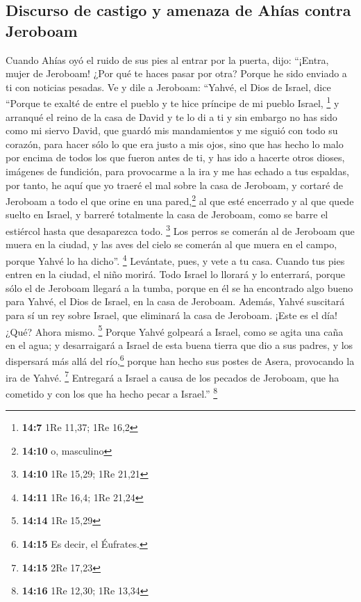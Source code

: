 \hypertarget{discurso-de-castigo-y-amenaza-de-ahuxedas-contra-jeroboam}{%
\subsection{Discurso de castigo y amenaza de Ahías contra
Jeroboam}\label{discurso-de-castigo-y-amenaza-de-ahuxedas-contra-jeroboam}}

 Cuando Ahías oyó el ruido de sus pies al entrar por la
puerta, dijo: ``¡Entra, mujer de Jeroboam! ¿Por qué te haces pasar por
otra? Porque he sido enviado a ti con noticias pesadas. 
Ve y dile a Jeroboam: ``Yahvé, el Dios de Israel, dice ``Porque te
exalté de entre el pueblo y te hice príncipe de mi pueblo Israel,
\footnote{\textbf{14:7} 1Re 11,37; 1Re 16,2}  y arranqué
el reino de la casa de David y te lo di a ti y sin embargo no has sido
como mi siervo David, que guardó mis mandamientos y me siguió con todo
su corazón, para hacer sólo lo que era justo a mis ojos, 
sino que has hecho lo malo por encima de todos los que fueron antes de
ti, y has ido a hacerte otros dioses, imágenes de fundición, para
provocarme a la ira y me has echado a tus espaldas,  por
tanto, he aquí que yo traeré el mal sobre la casa de Jeroboam, y cortaré
de Jeroboam a todo el que orine en una pared,\footnote{\textbf{14:10} o,
  masculino} al que esté encerrado y al que quede suelto en Israel, y
barreré totalmente la casa de Jeroboam, como se barre el estiércol hasta
que desaparezca todo. \footnote{\textbf{14:10} 1Re 15,29; 1Re 21,21}
 Los perros se comerán al de Jeroboam que muera en la
ciudad, y las aves del cielo se comerán al que muera en el campo, porque
Yahvé lo ha dicho''. \footnote{\textbf{14:11} 1Re 16,4; 1Re 21,24}
 Levántate, pues, y vete a tu casa. Cuando tus pies
entren en la ciudad, el niño morirá.  Todo Israel lo
llorará y lo enterrará, porque sólo el de Jeroboam llegará a la tumba,
porque en él se ha encontrado algo bueno para Yahvé, el Dios de Israel,
en la casa de Jeroboam.  Además, Yahvé suscitará para sí
un rey sobre Israel, que eliminará la casa de Jeroboam. ¡Este es el día!
¿Qué? Ahora mismo. \footnote{\textbf{14:14} 1Re 15,29} 
Porque Yahvé golpeará a Israel, como se agita una caña en el agua; y
desarraigará a Israel de esta buena tierra que dio a sus padres, y los
dispersará más allá del río,\footnote{\textbf{14:15} Es decir, el
  Éufrates.} porque han hecho sus postes de Asera, provocando la ira de
Yahvé. \footnote{\textbf{14:15} 2Re 17,23}  Entregará a
Israel a causa de los pecados de Jeroboam, que ha cometido y con los que
ha hecho pecar a Israel.'' \footnote{\textbf{14:16} 1Re 12,30; 1Re 13,34}

